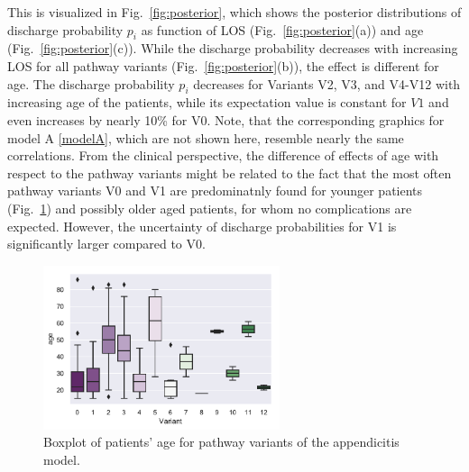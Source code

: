 This is visualized in Fig.~\ref{fig:posterior}, which shows the posterior distributions of discharge probability $p_i$ as function of LOS (Fig.~\ref{fig:posterior}(a)) and age (Fig.~\ref{fig:posterior}(c)). While the discharge probability decreases with increasing LOS for all pathway variants (Fig.~\ref{fig:posterior}(b)), the effect is different for age. 
The discharge probability $p_i$ decreases for Variants V2, V3, and V4-V12 with increasing age of the patients, while its expectation value is constant for $V1$ and even increases by nearly 10\% for V0. Note, that the corresponding graphics for model A \eqref{modelA}, which are not shown here, resemble nearly the same correlations. 
From the clinical perspective, the difference of effects of age with
respect to the pathway variants might be related to the fact that the
most often pathway variants V0 and V1 are predominatnly found for
younger patients (Fig.~\ref{Fig:boxplot}) and possibly older aged patients, for whom no complications are expected. 
However, the uncertainty of discharge probabilities for V1 is significantly larger compared to V0.

\begin{figure}
  \centering
  \includegraphics[width=0.618\textwidth]{images/DS19fA0_Lin20180730a__boxplot_age_variant.pdf}
\caption{Boxplot of patients' age for pathway variants of the
  appendicitis model.}
\label{Fig:boxplot}
\end{figure}
%

